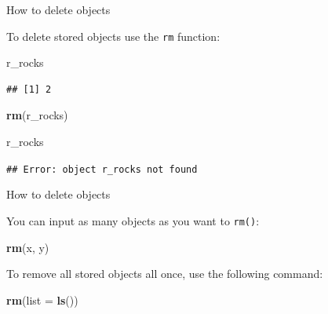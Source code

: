 \documentclass[ignorenonframetext,]{beamer}
\newenvironment{Shaded}{\begin{snugshade}}{\end{snugshade}}
\newcommand{\DataTypeTok}[1]{\textcolor[rgb]{0.13,0.29,0.53}{#1}}
\newcommand{\KeywordTok}[1]{\textcolor[rgb]{0.13,0.29,0.53}{\textbf{#1}}}
\newcommand{\NormalTok}[1]{#1}
\begin{document}
\begin{frame}[fragile]{How to delete objects}
\protect\hypertarget{how-to-delete-objects}{}

To delete stored objects use the \texttt{rm} function:

\begin{Shaded}
\begin{Highlighting}[]
\NormalTok{r_rocks}
\end{Highlighting}
\end{Shaded}

\begin{verbatim}
## [1] 2
\end{verbatim}

\begin{Shaded}
\begin{Highlighting}[]
\KeywordTok{rm}\NormalTok{(r_rocks)}
\end{Highlighting}
\end{Shaded}

\begin{Shaded}
\begin{Highlighting}[]
\NormalTok{r_rocks}
\end{Highlighting}
\end{Shaded}

\texttt{\#\#\ Error:\ object\ \textquotesingle{}r\_rocks\textquotesingle{}\ not\ found}

\end{frame}

\begin{frame}[fragile]{How to delete objects}
\protect\hypertarget{how-to-delete-objects-1}{}

You can input as many objects as you want to \texttt{rm()}:

\begin{Shaded}
\begin{Highlighting}[]
\KeywordTok{rm}\NormalTok{(x, y)}
\end{Highlighting}
\end{Shaded}

To remove all stored objects all once, use the following command:

\begin{Shaded}
\begin{Highlighting}[]
\KeywordTok{rm}\NormalTok{(}\DataTypeTok{list =} \KeywordTok{ls}\NormalTok{())}
\end{Highlighting}
\end{Shaded}

\end{frame}
\end{document}
